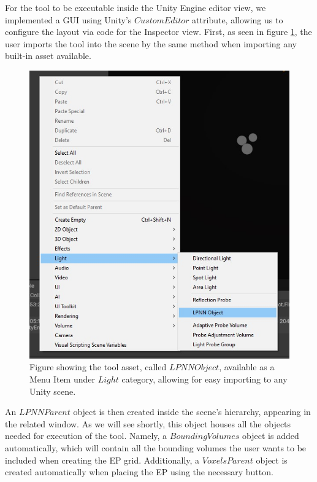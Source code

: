 For the tool to be executable inside the Unity Engine editor view, we implemented a GUI using Unity's $CustomEditor$ attribute, allowing us to configure the layout via code for the Inspector view. First, as seen in figure \ref{fig:UI_add}, the user imports the tool into the scene by the same method when importing any built-in asset available.

\begin{figure}[h]
	\centering
	\includegraphics[scale=0.6]{Graphics/UI_lpnn.jpg}
	\caption{Figure showing the tool asset, called $LPNN Object$, available as a Menu Item under $Light$ category, allowing for easy importing to any Unity scene.}
	\label{fig:UI_add}
\end{figure}

An $LPNN Parent$ object is then created inside the scene's hierarchy, appearing in the related window. As we will see shortly, this object houses all the objects needed for execution of the tool. Namely, a $BoundingVolumes$ object is added automatically, which will contain all the bounding volumes the user wants to be included when creating the EP grid. Additionally, a $VoxelsParent$ object is created automatically when placing the EP using the necessary button. 

